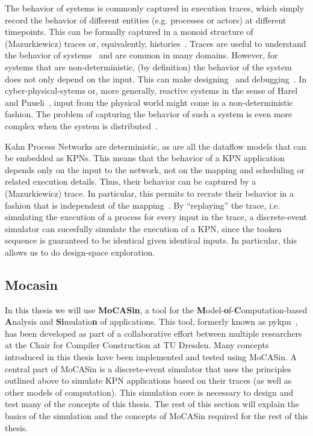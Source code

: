 The behavior of systems is commonly captured in execution traces, which simply record the behavior of different entities (e.g. processes or actors) at different timepoints.
This can be formally captured in a monoid structure of (Mazurkiewicz) traces or, equivalently, histories~\cite{diekert1995book}.
Traces are useful to understand the behavior of systems~\cite{vampir} and are common in many domains. However, for systems that are non-deterministic, (by definition) the behavior of the system does not only depend on the input.
This can make designing~\cite{lee2006problem} and debugging~\cite{murillo_debugging}.
In cyber-physical-sytems or, more generally, reactive systems in the sense of Harel and Pnueli~\cite{harel_pnueli_reactive}, input from the physical world might come in a non-deterministic fashion.
The problem of capturing the behavior of such a system is even more complex when the system is distributed~\cite{shaver_phdthesis}. 

Kahn Process Networks are deterministic, as are all the dataflow models that can be embedded as KPNs.
This means that the behavior of a KPN application depends only on the input to the network, not on the mapping and scheduling or related execution details.
Thus, their behavior can be captured by a (Mazurkiewicz) trace.
In particular, this permits to recrate their behavior in a fashion that is independent of the mapping~\cite{find_proper_references}.
By ``replaying'' the trace, i.e. simulating the execution of a process for every input in the trace, a discrete-event simulator can sucesfully simulate the execution of a KPN, since the tooken sequence is guaranteed to be identical given identical inputs. In particular, this allows us to do design-space exploration.

\subsection{Mocasin}

In this thesis we will use \textbf{MoCASin}, a tool for the \textbf{M}odel-\textbf{o}f-\textbf{C}omputation-based \textbf{A}nalysis and \textbf{Si}mulatio\textbf{n} of applications. This tool, formerly known as pykpn~\cite{goens_mcsoc18}, has been developed as part of a collaborative effort between multiple researchers at the Chair for Compiler Construction at TU Dresden. Many concepts introduced in this thesis have been implemented and tested using MoCASin. A central part of MoCASin is a discrete-event simulator that uses the principles outlined above to simulate KPN applications based on their traces (as well as other models of computation). This simulation core is necessary to design and test many of the concepts of this thesis. The rest of this section will explain the basics of the simulation and the concepts of MoCASin required for the rest of this thesis.

